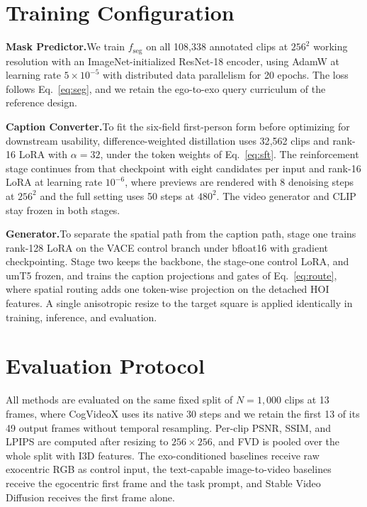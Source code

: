 \documentclass{article}
\begin{document}
\appendix

\section{Training Configuration}
\label{app:impl}

\textbf{Mask Predictor.}\quad We train $f_{\mathrm{seg}}$ on all 108{,}338
annotated clips at $256^2$ working resolution with an ImageNet-initialized
ResNet-18 encoder, using AdamW at learning rate $5\times10^{-5}$ with
distributed data parallelism for 20 epochs. The loss follows
Eq.~\ref{eq:seg}, and we retain the ego-to-exo query curriculum of the
reference design.

\textbf{Caption Converter.}\quad To fit the six-field first-person form before
optimizing for downstream usability, difference-weighted distillation uses
32{,}562 clips and rank-16 LoRA with $\alpha=32$, under the token weights of
Eq.~\ref{eq:sft}. The reinforcement stage continues from that checkpoint with
eight candidates per input and rank-16 LoRA at learning rate $10^{-6}$, where
previews are rendered with 8 denoising steps at $256^2$ and the full setting
uses 50 steps at $480^2$. The video generator and CLIP stay frozen in both
stages.

\textbf{Generator.}\quad To separate the spatial path from the caption path,
stage one trains rank-128 LoRA on the VACE control branch under bfloat16 with gradient checkpointing. Stage two keeps the
backbone, the stage-one control LoRA, and umT5 frozen, and trains the caption
projections and gates of Eq.~\ref{eq:route}, where spatial routing adds one
token-wise projection on the detached HOI features. A single anisotropic
resize to the target square is applied identically in training, inference, and
evaluation.

\section{Evaluation Protocol}
\label{app:eval}

All methods are evaluated on the same fixed split of $N{=}1{,}000$ clips at
13 frames, where CogVideoX uses its native 30 steps and we retain the first 13 of
its 49 output frames without temporal resampling. Per-clip PSNR, SSIM, and LPIPS are
computed after resizing to $256\times256$, and FVD is pooled over the whole
split with I3D features. The exo-conditioned baselines receive raw
exocentric RGB as control input, the text-capable image-to-video baselines
receive the egocentric first frame and the task prompt, and Stable Video
Diffusion receives the first frame alone.
\end{document}
